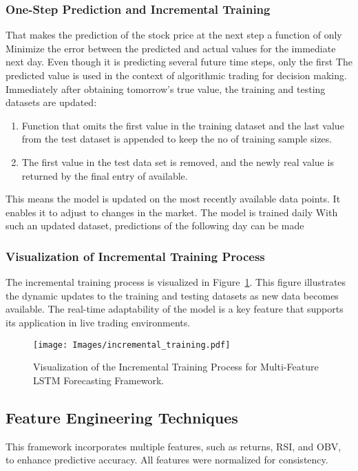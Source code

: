 \subsubsection{One-Step Prediction and Incremental Training}
That makes the prediction of the stock price at the next step a function of only
Minimize the error between the predicted and actual values for the immediate next day. Even though it is predicting several future time steps, only the first
The predicted value is used in the context of algorithmic trading for decision making.
Immediately after obtaining tomorrow's true value, the training and testing datasets
are updated:
\begin{enumerate}
    \item Function that omits the first value in the training dataset and the last value from the test dataset is appended to keep the no of training sample sizes.
    \item The first value in the test data set is removed, and the newly
real value is returned by the final entry of available.
\end{enumerate}

This means the model is updated on the most recently available data points.
It enables it to adjust to changes in the market. The model is trained daily
With such an updated dataset, predictions of the following day can be made

\subsubsection{Visualization of Incremental Training Process}
The incremental training process is visualized in Figure~\ref{fig:incremental_training}. This figure illustrates the dynamic updates to the training and testing datasets as new data becomes available. The real-time adaptability of the model is a key feature that supports its application in live trading environments.

\begin{figure}[h!]
    \centering
    \texttt{[image: Images/incremental\_training.pdf]}
    \caption{Visualization of the Incremental Training Process for Multi-Feature LSTM Forecasting Framework.}
    \label{fig:incremental_training}
\end{figure}

\subsection{Feature Engineering Techniques}
This framework incorporates multiple features, such as returns, RSI, and OBV, to enhance predictive accuracy. All features were normalized for consistency. 

